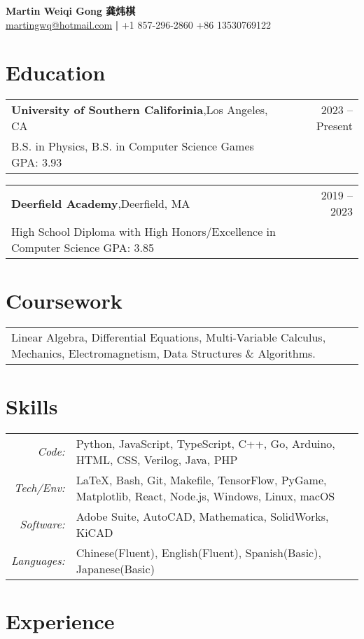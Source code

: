 \documentclass[oneside, 11pt]{article}
\newcommand*{\experienceEntry}[4]{
	\noindent
	\begin{tabularx}{\textwidth}{Xr}
	\textbf{#1},\quad #2 & #3\\
	#4
	\end{tabularx}
	\vspace{-0.75\baselineskip}
}
\begin{document}
\begin{center}
	\Large \textbf{Martin Weiqi Gong 龚炜棋}\\
	\normalsize \href{mailto:martingwq@hotmail.com}{martingwq@hotmail.com} \thinspace \textbf{|} \thinspace +1 857-296-2860 \thinspace +86 13530769122
\end{center}

\section*{Education}

\experienceEntry{University of Southern Califorinia}
	{Los Angeles, CA}
	{2023 -- Present}
	{B.S. in Physics, B.S. in Computer Science Games \quad GPA: 3.93}

\experienceEntry{Deerfield Academy}
	{Deerfield, MA}
	{2019 -- 2023}
	{High School Diploma with High Honors/Excellence in Computer Science \quad GPA: 3.85}

\section*{Coursework}

\begin{tabular}{ p{\textwidth - 1em} }
	Linear Algebra, Differential Equations, Multi-Variable Calculus, Mechanics, Electromagnetism, Data Structures \& Algorithms.
\end{tabular}

\section*{Skills}

\begin{tabularx}{\textwidth}{rX}
	\textit{Code:} & Python, JavaScript, TypeScript, C++, Go, Arduino, HTML, CSS, Verilog, Java, PHP\\
	\textit{Tech/Env:} & \LaTeX, Bash, Git, Makefile, TensorFlow, PyGame, Matplotlib, React, Node.js, Windows, Linux, macOS\\
	\textit{Software:} & Adobe Suite, AutoCAD, Mathematica, SolidWorks, KiCAD\\
	\textit{Languages:} & Chinese(Fluent), English(Fluent), Spanish(Basic), Japanese(Basic)
\end{tabularx}


\section*{Experience}
\end{document}
